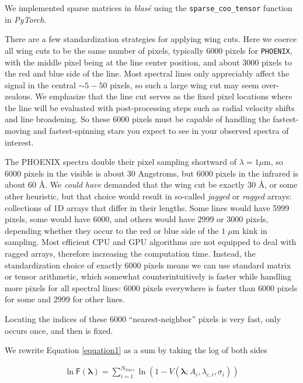 \documentclass[modern]{aastex631}
\begin{document}
We implemented sparse matrices in \emph{blas\'e} using the \texttt{sparse\_coo\_tensor} function in \emph{PyTorch}.

There are a few standardization strategies for applying wing cuts. Here we coerce all wing cuts to be the same number of pixels, typically 6000 pixels for \texttt{PHOENIX}, with the middle pixel being at the line center position, and about 3000 pixels to the red and blue side of the line. Most spectral lines only appreciably affect the signal in the central $\sim5-50$ pixels, so such a large wing cut may seem over-zealous. We emphasize that the line cut serves as the fixed pixel locations where the line will be evaluated with post-processing steps such as radial velocity shifts and line broadening. So these 6000 pixels must be capable of handling the fastest-moving and fastest-spinning stars you expect to see in your observed spectra of interest.

The PHOENIX spectra double their pixel sampling shortward of $\lambda = 1 \mu$m, so 6000 pixels in the visible is about 30 Angstroms, but 6000 pixels in the infrared is about 60 \AA. We \emph{could have} demanded that the wing cut be exactly 30 \AA, or some other heuristic, but that choice would result in so-called \emph{jagged} or \emph{ragged} arrays: collections of 1D arrays that differ in their lengths. Some lines would have 5999 pixels, some would have 6000, and others would have 2999 or 3000 pixels, depending whether they occur to the red or blue side of the $1 \;\mu$m kink in sampling. Most efficient CPU and GPU algorithms are not equipped to deal with ragged arrays, therefore increasing the computation time. Instead, the standardization choice of exactly 6000 pixels means we can use standard matrix or tensor arithmetic, which somewhat counterintuitively is faster while handling more pixels for all spectral lines: 6000 pixels everywhere is faster than 6000 pixels for some and 2999 for other lines.

Locating the indices of these 6000 ``nearest-neighbor'' pixels is very fast, only occurs once, and then is fixed.

We rewrite Equation \ref{equation1} as a sum by taking the log of both sides

\begin{eqnarray}
    \ln{\mathsf{F}(\bm{\lambda})} = \sum_{i=1}^{N_{lines}} \ln{\left(1-V(\bm{\lambda};A_i, \lambda_{c,i}, \sigma_i) \right)}
\end{eqnarray}
\end{document}
